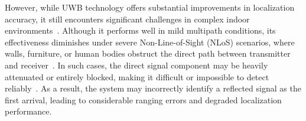 However, while UWB technology offers substantial improvements in localization accuracy, it still encounters significant challenges in complex indoor environments~\cite{Yang2024}. Although it performs well in mild multipath conditions, its effectiveness diminishes under severe Non-Line-of-Sight (NLoS) scenarios, where walls, furniture, or human bodies obstruct the direct path between transmitter and receiver~\cite{Wang2023NLoS}. In such cases, the direct signal component may be heavily attenuated or entirely blocked, making it difficult or impossible to detect reliably~\cite{Tran2022UWB, pei2024fcn}. As a result, the system may incorrectly identify a reflected signal as the first arrival, leading to considerable ranging errors and degraded localization performance.

